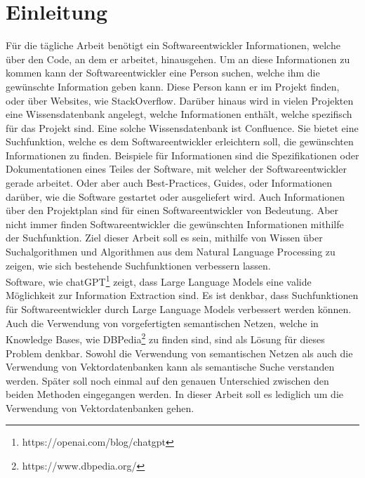 \chapter{Einleitung}
Für die tägliche Arbeit benötigt ein Softwareentwickler Informationen, welche über den Code, an dem er arbeitet, hinausgehen.
Um an diese Informationen zu kommen kann der Softwareentwickler eine Person suchen, welche ihm die gewünschte Information geben kann.
Diese Person kann er im Projekt finden, oder über Websites, wie StackOverflow.
Darüber hinaus wird in vielen Projekten eine Wissensdatenbank angelegt, welche Informationen enthält, welche spezifisch für das Projekt sind.
Eine solche Wissensdatenbank ist Confluence.
Sie bietet eine Suchfunktion, welche es dem Softwareentwickler erleichtern soll, die gewünschten Informationen zu finden.
Beispiele für Informationen sind die Spezifikationen oder Dokumentationen eines Teiles der Software, mit welcher der Softwareentwickler gerade arbeitet.
Oder aber auch Best-Practices, Guides, oder Informationen darüber, wie die Software gestartet oder ausgeliefert wird.
Auch Informationen über den Projektplan sind für einen Softwareentwickler von Bedeutung.
Aber nicht immer finden Softwareentwickler die gewünschten Informationen mithilfe der Suchfunktion.
Ziel dieser Arbeit soll es sein, mithilfe von Wissen über Suchalgorithmen und Algorithmen aus dem Natural Language Processing zu zeigen, wie sich bestehende Suchfunktionen verbessern lassen.\\

Software, wie chatGPT\footnote{https://openai.com/blog/chatgpt} zeigt, dass Large Language Models eine valide Möglichkeit zur Information Extraction sind.
Es ist denkbar, dass Suchfunktionen für Softwareentwickler durch Large Language Models verbessert werden können.
Auch die Verwendung von vorgefertigten semantischen Netzen, welche in Knowledge Bases, wie DBPedia\footnote{https://www.dbpedia.org/} zu finden sind, sind als Lösung für dieses Problem denkbar.\cite{1644735}
Sowohl die Verwendung von semantischen Netzen als auch die Verwendung von Vektordatenbanken kann als semantische Suche verstanden werden.
Später soll noch einmal auf den genauen Unterschied zwischen den beiden Methoden eingegangen werden.
In dieser Arbeit soll es lediglich um die Verwendung von Vektordatenbanken gehen.

